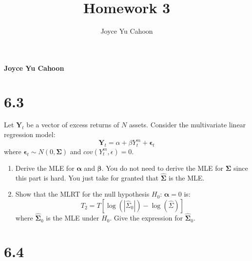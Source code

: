 \documentclass[11pt,]{article}
\title{Homework 3  }
\author{\Large Joyce Yu Cahoon\vspace{0.05in} \newline\normalsize\emph{}  }
\date{}
\newcommand*{\authorfont}{\fontfamily{phv}\selectfont}
\providecommand{\tightlist}{%
\setlength{\itemsep}{0pt}\setlength{\parskip}{0pt}}
\begin{document}
%

{%
\setlength{\parindent}{0pt}
\thispagestyle{plain}
{\fontsize{18}{20}\selectfont\raggedright 
\maketitle  %

}

{
  \vskip 13.5pt\relax \normalsize\fontsize{11}{12} 
  \textbf{\authorfont Joyce Yu Cahoon} \hskip 15pt \emph{\small }   
  
}

}






\vskip 6.5pt


\noindent  \hypertarget{section}{%
\section{6.3}\label{section}}

Let \({\bm{{Y}}}_t\) be a vector of excess returns of \(N\) assets.
Consider the multivariate linear regression model: \[
{\bm{{Y}}}_t = \alpha + \beta Y_t^m + {\bm{{\epsilon}}}_t
\] where \({\bm{{\epsilon}}}_t \sim N(0, {\bm{{\Sigma}}})\) and
\(cov(Y_t^m, \epsilon) = 0\).

\begin{enumerate}
\def\labelenumi{\arabic{enumi}.}
\tightlist
\item
  Derive the MLE for \({\bm{{\alpha}}}\) and \({\bm{{\beta}}}\). You do
  not need to derive the MLE for \({\bm{{\Sigma}}}\) since this part is
  hard. You just take for granted that \({\bm{{\hat{\Sigma}}}}\) is the
  MLE.
\item
  Show that the MLRT for the null hypothesis \(H_0\):
  \({\bm{{\alpha}}} = 0\) is: \[
  T_2 = T[\log{(|\hat{\Sigma}_0|)} - \log{(\hat{\Sigma})}]
  \] where \({\bm{{\hat{\Sigma}}}}_0\) is the MLE under \(H_0\). Give
  the expression for \({\bm{{\hat{\Sigma}}}}_0\).
\end{enumerate}

\newpage

\hypertarget{section-1}{%
\section{6.4}\label{section-1}}
\end{document}
